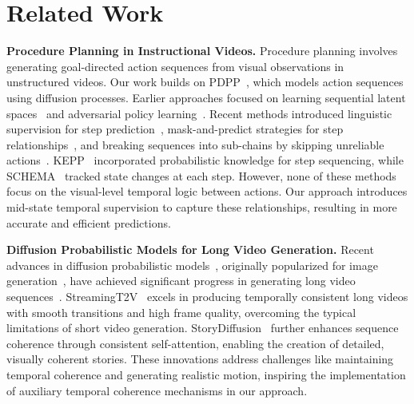 \section{Related Work}
\label{gen_inst}
\textbf{Procedure Planning in Instructional Videos.} Procedure planning involves generating goal-directed action sequences from visual observations in unstructured videos. Our work builds on PDPP~\citep{wang2023pdpp}, which models action sequences using diffusion processes. Earlier approaches focused on learning sequential latent spaces~\citep{chang2020procedure} and adversarial policy learning~\citep{bi2021procedure}. Recent methods introduced linguistic supervision for step prediction~\citep{zhao2022p3iv}, mask-and-predict strategies for step relationships~\citep{wang2023event}, and breaking sequences into sub-chains by skipping unreliable actions~\citep{li2023skip}. KEPP~\citep{nagasinghe2024not} incorporated probabilistic knowledge for step sequencing, while SCHEMA~\citep{niu2024schema} tracked state changes at each step. However, none of these methods focus on the visual-level temporal logic between actions. Our approach introduces mid-state temporal supervision to capture these relationships, resulting in more accurate and efficient predictions.


\textbf{Diffusion Probabilistic Models for Long Video Generation.} 
Recent advances in diffusion probabilistic models~\citep{croitoru2023diffusion}, originally popularized for image generation~\citep{rombach2022high}, have achieved significant progress in generating long video sequences~\citep{weng2024art,zhou2024upscale,jiang2024videobooth}. StreamingT2V~\citep{henschel2024streamingt2v} excels in producing temporally consistent long videos with smooth transitions and high frame quality, overcoming the typical limitations of short video generation. StoryDiffusion~\citep{zhou2024storydiffusion} further enhances sequence coherence through consistent self-attention, enabling the creation of detailed, visually coherent stories. These innovations address challenges like maintaining temporal coherence and generating realistic motion, inspiring the implementation of auxiliary temporal coherence mechanisms in our approach.
